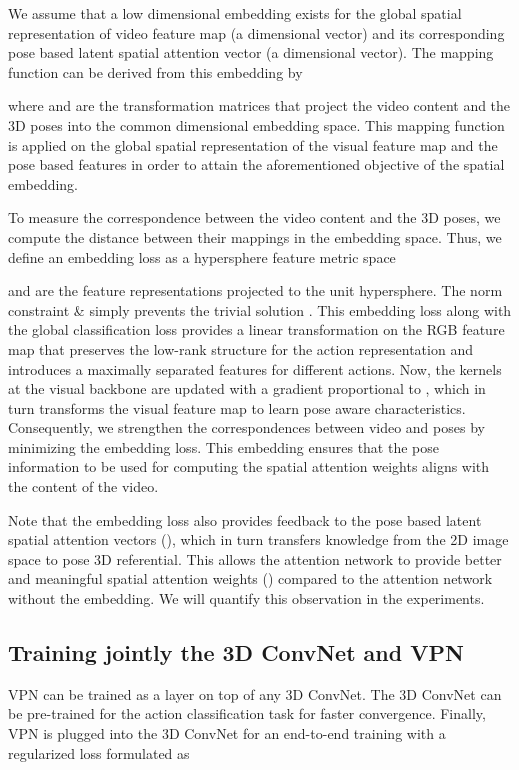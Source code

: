 \documentclass[runningheads]{llncs}
\begin{document}
We assume that a low dimensional embedding exists for the global spatial representation of video feature map  (a  dimensional vector) and its corresponding pose based latent spatial attention vector  (a  dimensional vector). The mapping function can be derived from this embedding by

where  and  are the transformation matrices that project the video content and the 3D poses into the common  dimensional embedding space. This mapping function is applied on the global spatial representation of the visual feature map and the pose based features in order to attain the aforementioned objective of the spatial embedding. 

\noindent To measure the correspondence between the video content and the 3D poses, we compute the distance between their mappings in the embedding space. Thus, we define an embedding loss as a hypersphere feature metric space 

 and  are the feature representations projected to the unit hypersphere. The norm constraint  \&  simply prevents the trivial solution . This embedding loss along with the global classification loss provides a linear transformation on the RGB feature map that preserves the low-rank structure for the action representation and introduces a maximally separated features for different actions. Now, the kernels at the visual backbone are updated with a gradient proportional to , which in turn transforms the visual feature map to learn pose aware characteristics.
Consequently, we strengthen the correspondences between video and poses by minimizing the embedding loss. This embedding ensures that the pose information to be used for computing the spatial attention weights aligns with the content of the video.

 Note that the embedding loss also provides feedback to the pose based latent spatial attention vectors (), which in turn transfers knowledge from the 2D image space to pose 3D referential. This allows the attention network to provide better and meaningful spatial attention weights () compared to the attention network without the embedding. We will quantify this observation in the experiments.

\subsection{Training jointly the 3D ConvNet and VPN}
VPN can be trained as a layer on top of any 3D ConvNet. The 3D ConvNet can be pre-trained for the action classification task for faster convergence. Finally, VPN is plugged into the 3D ConvNet for an end-to-end training with a regularized loss  formulated as
\end{document}
